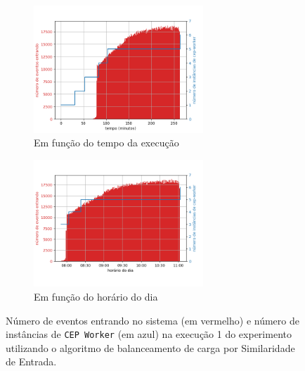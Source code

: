 \begin{figure}[h]
\centering
\begin{subfigure}{\textwidth}
\centering
\includegraphics[width=0.7\textwidth]{figuras/graphics/carga_e_workers_total6-dez-is.png}
\caption{Em função do tempo da execução}
\label{fig:workers_and_load_total-6-dez-is}
\end{subfigure}%

\begin{subfigure}{\textwidth}
\centering
\includegraphics[width=0.7\textwidth]{figuras/graphics/carga_e_workers_horario6-dez-is.png}
\caption{Em função do horário do dia}
\label{fig:workers_and_load_SPtrans-6-dez-is}
\end{subfigure}%
\caption{Número de eventos entrando no sistema (em vermelho) e número de instâncias de \texttt{CEP Worker} (em azul) na execução 1 do experimento utilizando o algoritmo de balanceamento de carga por Similaridade de Entrada.}
\end{figure}





